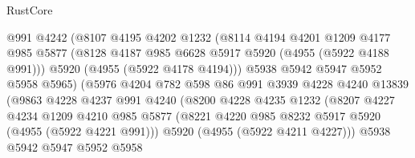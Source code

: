\begin{lexlean}{RustCore}
\begin{coremodule}
                              @991
                              @4242
                              (@8107
                                @4195
                                @4202
                                @1232
                                (@8114
                                  @4194
                                  @4201
                                  @1209
                                  @4177
                                  @985
                                  @5877
                                  (@8128 @4187 @985 @6628 @5917 @5920 (@4955 (@5922 @4188 @991)))
                                  @5920
                                  (@4955 (@5922 @4178 @4194)))
                                @5938
                                @5942
                                @5947
                                @5952
                                @5958
                                @5965)
                              (@5976
                                @4204
                                @782
                                @598
                                @86
                                @991
                                @3939
                                @4228
                                @4240
                                @13839
                                (@9863
                                  @4228
                                  @4237
                                  @991
                                  @4240
                                  (@8200
                                    @4228
                                    @4235
                                    @1232
                                    (@8207
                                      @4227
                                      @4234
                                      @1209
                                      @4210
                                      @985
                                      @5877
                                      (@8221
                                        @4220
                                        @985
                                        @8232
                                        @5917
                                        @5920
                                        (@4955 (@5922 @4221 @991)))
                                      @5920
                                      (@4955 (@5922 @4211 @4227)))
                                    @5938
                                    @5942
                                    @5947
                                    @5952
                                    @5958

\end{coremodule}
\end{lexlean}
